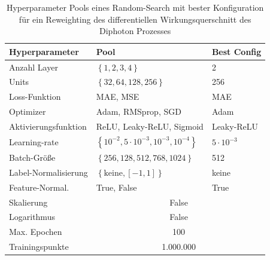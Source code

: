 \begin{table}
	\centering
	\begin{tabular}{|l|l|l|}
		\hline
		Hyperparameter & Pool & Best Config \\
		\hline
		Anzahl Layer & $\left\lbrace 1,2,3,4\right\rbrace$ & 2 \\
		Units &$\left\lbrace 32, 64, 128, 256\right\rbrace$ & 256 \\
		Loss-Funktion & MAE, MSE & MAE \\
		Optimizer & Adam, RMSprop, SGD  & Adam\\
		Aktivierungsfunktion & ReLU, Leaky-ReLU, Sigmoid & Leaky-ReLU \\
		Learning-rate & $\left\lbrace 10^{-2}, 5 \cdot 10^{-3}, 10^{-3}, 10^{-4} \right\rbrace $ & $5 \cdot 10^{-3}$\\
		Batch-Größe & $\left\lbrace 256, 128, 512, 768, 1024 \right\rbrace $ & 512\\
		Label-Normalisierung & $\left\lbrace \text{keine}, [-1,1]\right\rbrace $ & keine\\
		Feature-Normal. & True, False & True \\
		\hline
		Skalierung & \multicolumn{2}{c|}{False} \\
		Logarithmus & \multicolumn{2}{c|}{False} \\ 
		Max. Epochen & \multicolumn{2}{c|}{100}\\
		Trainingspunkte & \multicolumn{2}{c|}{1.000.000} \\
		\hline
	\end{tabular}
	\caption{Hyperparameter Pools eines Random-Search mit bester Konfiguration für ein Reweighting des differentiellen Wirkungsquerschnitt des Diphoton Prozesses}
\end{table}
